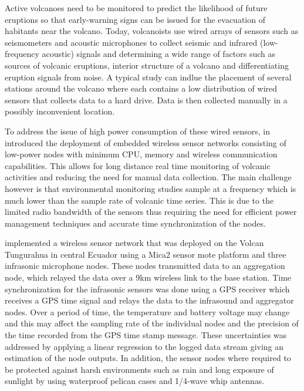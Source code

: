 Active volcanoes need to be monitored to predict the likelihood of future eruptions so that early-warning signs can be issued for the evacuation of habitants near the volcano. Today, volcanoists use wired arrays of sensors such as seismometers and acoustic microphones to collect seismic and infrared (low-frequency acoustic) signals and determining a wide range of factors such as sources of volcanic eruptions, interior structure of a volcano and differentiating eruption signals from noise. A typical study can indlue the placement of several stations around the volcano where each contains a low distribution of wired sensors that collects data to a hard drive. Data is then collected manually in a possibly inconvenient location.

To address the issue of high power consumption of these wired sensors, \citeauthor{Werner-Allen:2006:FYV:1298455.1298491} in \cite{Werner-Allen:2006:FYV:1298455.1298491} introduced the deployment of embedded wireless sensor networks consisting of low-power nodes with minimum CPU, memory and wireless communication capabilities. This allows for long distance real time monitoring of volcanic activities and reducing the need for manual data collection. The main challenge however is that environmental monitoring studies sample at a frequency which is much lower than the sample rate of volcanic time series. This is due to the limited radio bandwidth of the sensors thus requiring the need for efficient power management techniques and accurate time synchronization of the nodes. 

\citeauthor{Werner-Allen:2006:FYV:1298455.1298491} implemented a wireless sensor network that was deployed on the Volcan Tungurahua in central Ecuador using a Mica2 sensor mote platform and three infrasonic microphone nodes. These nodes transmitted data to an aggregation node, which relayed the data over a 9km wireless link to the base station. Time synchronization for the infrasonic sensors was done using a GPS receiver which receives a GPS time signal and relays the data 
to the infrasound and aggregator nodes. Over a period of time, the temperature and battery voltage may change and this may affect the sampling rate of the individual nodes and the precision of the time recorded from the GPS time stamp message. These uncertainties was addressed by applying a linear regression to the logged data stream giving an estimation of the node outputs. In addition, the sensor nodes where required to be protected against harsh environments such as rain and long exposure of sunlight by using waterproof pelican cases and 1/4-wave whip antennas.

